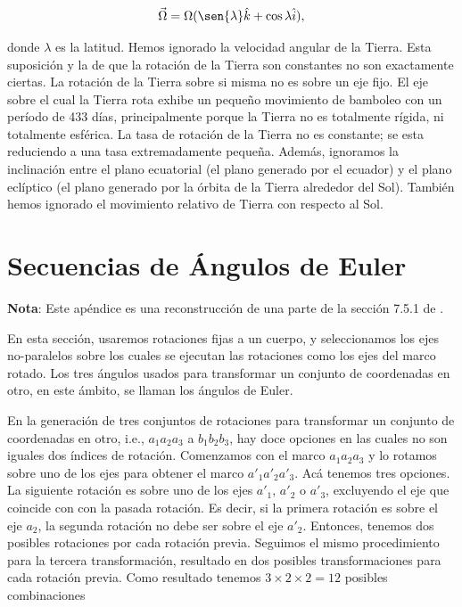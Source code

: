 \documentclass[a4paper,10pt]{article}
\numberwithin{equation}{section}
\begin{document}
\begin{equation}
 \vec{\Omega} = \Omega(\sen{\lambda}\hat{k}+\cos{\lambda}\hat{i}),
 \label{eq:velAngTierra1}
\end{equation}

donde $\lambda$ es la latitud. Hemos ignorado la velocidad angular de la Tierra. Esta 
suposición y la de que la rotación de la Tierra son constantes no son exactamente 
ciertas. La rotación de la Tierra sobre si misma no es sobre un eje fijo. El eje 
sobre el cual la Tierra rota exhibe un pequeño movimiento de bamboleo con un 
período de 433 días, principalmente porque la Tierra no es totalmente rígida, ni 
totalmente esférica. La tasa de rotación de la Tierra no es constante; se esta 
reduciendo a una tasa extremadamente pequeña. Además, ignoramos la inclinación 
entre el plano ecuatorial (el plano generado por el ecuador) y el plano eclíptico 
(el plano generado por la órbita de la Tierra alrededor del Sol). También hemos 
ignorado el movimiento relativo de Tierra con respecto al Sol.

\newpage

\section{Secuencias de Ángulos de Euler} \label{app:apendice2}

\textbf{Nota}: Este apéndice es una reconstrucción de una parte de la sección 7.5.1 
de \cite{baruh}.

\vspace{.3cm}

En esta sección, usaremos rotaciones fijas a un cuerpo, y seleccionamos 
los ejes no-paralelos sobre los cuales se ejecutan las rotaciones como los ejes 
del marco rotado. Los tres ángulos usados para transformar un conjunto de coordenadas 
en otro, en este ámbito, se llaman los ángulos de Euler.

\vspace{.3cm}

En la generación de tres conjuntos de rotaciones para transformar un conjunto de 
coordenadas en otro, i.e., $a_1a_2a_3$ a $b_1b_2b_3$, hay doce opciones en las cuales 
no son iguales dos índices de rotación. Comenzamos con el marco $a_1a_2a_3$ y lo 
rotamos sobre uno de los ejes para obtener el marco $a'_1a'_2a'_3$. Acá tenemos 
tres opciones. La siguiente rotación es sobre uno de los ejes $a'_1$, $a'_2$ o $a'_3$, 
excluyendo el eje que coincide con con la pasada rotación. Es decir, si la primera 
rotación es sobre el eje $a_2$, la segunda rotación no debe ser sobre el eje $a'_2$. 
Entonces, tenemos dos posibles rotaciones por cada rotación previa. Seguimos el mismo 
procedimiento para la tercera transformación, resultado en dos posibles transformaciones 
para cada rotación previa. Como resultado tenemos $3 \times 2 \times 2 = 12$ posibles 
combinaciones 
\end{document}
